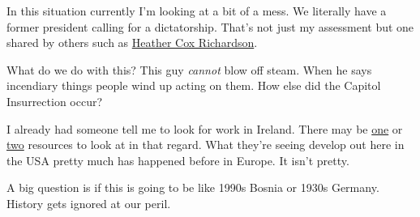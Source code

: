 In this situation currently I'm looking at a bit of a mess. We literally
have a former president calling for a dictatorship. That's not just my
assessment but one shared by others such as
\href{https://heathercoxrichardson.substack.com/p/december-3-2022}{Heather
Cox Richardson}.

What do we do with this? This guy \emph{cannot} blow off steam. When he
says incendiary things people wind up acting on them. How else did the
Capitol Insurrection occur?

I already had someone tell me to look for work in Ireland. There may be
\href{https://www.churchofchrist.ie/}{one} or
\href{https://thechurchofchrist.ie/}{two} resources to look at in that
regard. What they're seeing develop out here in the USA pretty much has
happened before in Europe. It isn't pretty.

A big question is if this is going to be like 1990s Bosnia or 1930s
Germany. History gets ignored at our peril.
